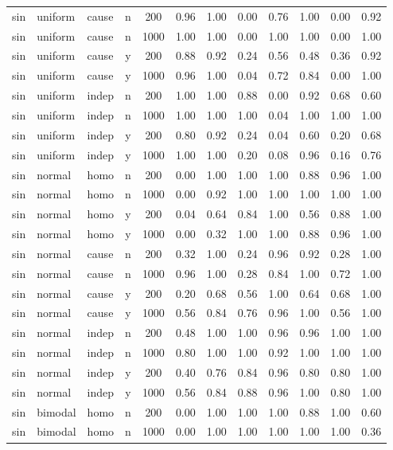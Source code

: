 \begin{longtable}{@{}lllccccccccc@{}}
sin & uniform & cause & n & 200 & 0.96 & 1.00 & 0.00 & 0.76 & 1.00 & 0.00 & 0.92\\
sin & uniform & cause & n & 1000 & 1.00 & 1.00 & 0.00 & 1.00 & 1.00 & 0.00 & 1.00\\
sin & uniform & cause & y & 200 & 0.88 & 0.92 & 0.24 & 0.56 & 0.48 & 0.36 & 0.92\\
sin & uniform & cause & y & 1000 & 0.96 & 1.00 & 0.04 & 0.72 & 0.84 & 0.00 & 1.00\\
sin & uniform & indep & n & 200 & 1.00 & 1.00 & 0.88 & 0.00 & 0.92 & 0.68 & 0.60\\
sin & uniform & indep & n & 1000 & 1.00 & 1.00 & 1.00 & 0.04 & 1.00 & 1.00 & 1.00\\
sin & uniform & indep & y & 200 & 0.80 & 0.92 & 0.24 & 0.04 & 0.60 & 0.20 & 0.68\\
sin & uniform & indep & y & 1000 & 1.00 & 1.00 & 0.20 & 0.08 & 0.96 & 0.16 & 0.76\\
sin & normal & homo & n & 200 & 0.00 & 1.00 & 1.00 & 1.00 & 0.88 & 0.96 & 1.00\\
sin & normal & homo & n & 1000 & 0.00 & 0.92 & 1.00 & 1.00 & 1.00 & 1.00 & 1.00\\
sin & normal & homo & y & 200 & 0.04 & 0.64 & 0.84 & 1.00 & 0.56 & 0.88 & 1.00\\
sin & normal & homo & y & 1000 & 0.00 & 0.32 & 1.00 & 1.00 & 0.88 & 0.96 & 1.00\\
sin & normal & cause & n & 200 & 0.32 & 1.00 & 0.24 & 0.96 & 0.92 & 0.28 & 1.00\\
sin & normal & cause & n & 1000 & 0.96 & 1.00 & 0.28 & 0.84 & 1.00 & 0.72 & 1.00\\
sin & normal & cause & y & 200 & 0.20 & 0.68 & 0.56 & 1.00 & 0.64 & 0.68 & 1.00\\
sin & normal & cause & y & 1000 & 0.56 & 0.84 & 0.76 & 0.96 & 1.00 & 0.56 & 1.00\\
sin & normal & indep & n & 200 & 0.48 & 1.00 & 1.00 & 0.96 & 0.96 & 1.00 & 1.00\\
sin & normal & indep & n & 1000 & 0.80 & 1.00 & 1.00 & 0.92 & 1.00 & 1.00 & 1.00\\
sin & normal & indep & y & 200 & 0.40 & 0.76 & 0.84 & 0.96 & 0.80 & 0.80 & 1.00\\
sin & normal & indep & y & 1000 & 0.56 & 0.84 & 0.88 & 0.96 & 1.00 & 0.80 & 1.00\\
sin & bimodal & homo & n & 200 & 0.00 & 1.00 & 1.00 & 1.00 & 0.88 & 1.00 & 0.60\\
sin & bimodal & homo & n & 1000 & 0.00 & 1.00 & 1.00 & 1.00 & 1.00 & 1.00 & 0.36\\

\end{longtable}
